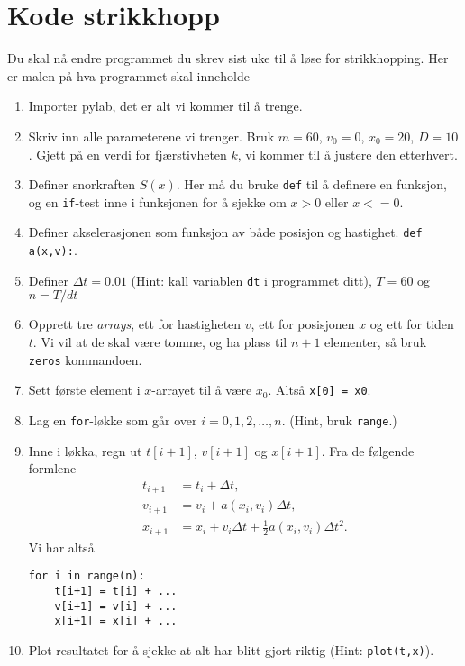 \documentclass[a4paper, 11pt, notitlepage]{article}
\begin{document}
\clearpage

\section*{Kode strikkhopp}
Du skal nå endre programmet du skrev sist uke til å løse for strikkhopping. Her er malen på hva programmet skal inneholde
\begin{enumerate}
    \item Importer pylab, det er alt vi kommer til å trenge.
    \item Skriv inn alle parameterene vi trenger. Bruk $m=60$, $v_0=0$, $x_0=20$, $D=10$. Gjett på en verdi for fjærstivheten $k$, vi kommer til å justere den etterhvert.
    \item Definer snorkraften $S(x)$. Her må du bruke \verb+def+ til å definere en funksjon, og en \verb+if+-test inne i funksjonen for å sjekke om $x>0$ eller $x<=0$. 
    \item Definer akselerasjonen som funksjon av både posisjon og hastighet. \verb+def a(x,v):+.
    \item Definer $\Delta t = 0.01$ (Hint: kall variablen \verb+dt+ i programmet ditt), $T=60$ og $n = T/dt$
    \item Opprett tre \emph{arrays}, ett for hastigheten $v$, ett for posisjonen $x$ og ett for tiden $t$. Vi vil at de skal være tomme, og ha plass til $n+1$ elementer, så bruk \verb+zeros+ kommandoen. 
    \item Sett første element i $x$-arrayet til å være $x_0$. Altså \verb+x[0] = x0+.
    \item Lag en \verb+for+-løkke som går over $i=0,1,2,\ldots,n$. (Hint, bruk \verb+range+.)
    \item Inne i løkka, regn ut $t[i+1]$, $v[i+1]$ og $x[i+1]$. Fra de følgende formlene
    \begin{align*}
    t_{i+1} &= t_i + \Delta t, \\
    v_{i+1} &= v_i + a(x_i, v_i)\Delta t, \\
    x_{i+1} &= x_i + v_i\Delta t + \frac{1}{2}a(x_i, v_i)\Delta t^2.
    \end{align*}
    Vi har altså
    \begin{lstlisting}
for i in range(n):
    t[i+1] = t[i] + ...
    v[i+1] = v[i] + ...
    x[i+1] = x[i] + ...    
    \end{lstlisting}
    \item Plot resultatet for å sjekke at alt har blitt gjort riktig (Hint: \verb+plot(t,x)+).
\end{enumerate}
\end{document}
